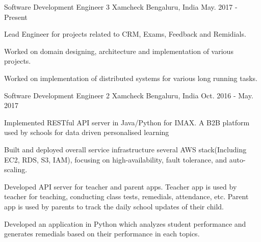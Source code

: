 

\begin{cventries}
  \cventry
    {Software Development Engineer 3} %
    {Xamcheck} %
    {Bengaluru, India} %
    {May. 2017 - Present} %
    {
      \begin{cvitems} %
        \item {Lead Engineer for projects related to CRM, Exams, Feedback and Remidials.}
        \item {Worked on domain designing, architecture and implementation of various projects.}
        \item {Worked on implementation of distributed systems for various long running tasks. }
      \end{cvitems}
    }

  \cventry
    {Software Development Engineer 2} %
    {Xamcheck} %
    {Bengaluru, India} %
    {Oct. 2016 - May. 2017} %
    {
      \begin{cvitems} %
        \item {Implemented RESTful API server in Java/Python for IMAX. A B2B platform used by schools for data driven personalised learning}
        \item {Built and deployed overall service infrastructure several AWS stack(Including EC2, RDS, S3, IAM), focusing on high-availability, fault tolerance, and auto-scaling.}
        \item {Developed API server for teacher and parent apps. Teacher app is used by teacher for teaching, conducting class tests, remedials, attendance, etc. Parent app is used by parents to track the daily school updates of their child.}
        \item {Developed an application in Python which analyzes student performance and generates remedials based on their performance in each topics.}
      \end{cvitems}
    }


\end{cventries}
